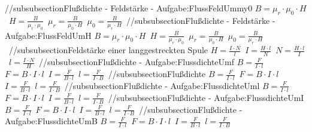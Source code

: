 //subsubsection{Flußdichte - Feldstärke - Aufgabe:FlussFeldUmmy0} 
$ B = \mu _{r} \cdot \mu _{0} \cdot H $\ 
$ H =\frac{ B}{\mu _{r} \cdot \mu _{0} } $\ 
$ \mu _{r} =\frac{ B}{\mu _{0} \cdot H} $\ 
$ \mu _{0} =\frac{ B}{\mu _{r} \cdot H} $\ 
//subsubsection{Flußdichte - Feldstärke - Aufgabe:FlussFeldUmH} 
$ B = \mu _{r} \cdot \mu _{0} \cdot H $\ 
$ H =\frac{ B}{\mu _{r} \cdot \mu _{0} } $\ 
$ \mu _{r} =\frac{ B}{\mu _{0} \cdot H} $\ 
$ \mu _{0} =\frac{ B}{\mu _{r} \cdot H} $\ 
//subsubsection{Feldstärke einer langgestreckten Spule} 
$ H = \frac{I\cdot N}{ l} $\ 
$ I = \frac{H\cdot l}{ N} $\ 
$ N = \frac{H\cdot l}{ I} $\ 
$ l = \frac{I\cdot N}{ H} $\ 
//subsubsection{Flußdichte - Aufgabe:FlussdichteUmf} 
$ B = \frac{ F}{I\cdot l} $\ 
$ F = B\cdot I\cdot l $\ 
$ I = \frac{ F}{B\cdot l} $\ 
$ l = \frac{ F}{I\cdot B} $\ 
//subsubsection{Flußdichte} 
$ B = \frac{ F}{I\cdot l} $\ 
$ F = B\cdot I\cdot l $\ 
$ I = \frac{ F}{B\cdot l} $\ 
$ l = \frac{ F}{I\cdot B} $\ 
//subsubsection{Flußdichte - Aufgabe:FlussdichteUml} 
$ B = \frac{ F}{I\cdot l} $\ 
$ F = B\cdot I\cdot l $\ 
$ I = \frac{ F}{B\cdot l} $\ 
$ l = \frac{ F}{I\cdot B} $\ 
//subsubsection{Flußdichte - Aufgabe:FlussdichteUmI} 
$ B = \frac{ F}{I\cdot l} $\ 
$ F = B\cdot I\cdot l $\ 
$ I = \frac{ F}{B\cdot l} $\ 
$ l = \frac{ F}{I\cdot B} $\ 
//subsubsection{Flußdichte - Aufgabe:FlussdichteUmB} 
$ B = \frac{ F}{I\cdot l} $\ 
$ F = B\cdot I\cdot l $\ 
$ I = \frac{ F}{B\cdot l} $\ 
$ l = \frac{ F}{I\cdot B} $\ 
